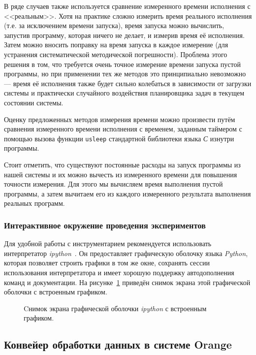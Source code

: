 В ряде случаев также используется сравнение измеренного времени исполнения с <<реальным>>. Хотя на практике сложно измерить время реального исполнения (т.е. за исключением времени запуска), время запуска можно вычислить, запустив программу, которая ничего не делает, и измерив время её исполнения. Затем можно вносить поправку на время запуска в каждое измерение (для устранения систематической методической погрешности). Проблема этого решения в том, что требуется очень точное измерение времени запуска пустой программы, но при применении тех же методов это принципиально невозможно --- время её исполнения также будет сильно колебаться в зависимости от загрузки системы и практически случайного воздействия планировщика задач в текущем состоянии системы.

Оценку предложенных методов измерения времени можно произвести путём сравнения измеренного времени исполнения с временем, заданным таймером с помощью вызова функции \texttt{usleep} стандартной библиотеки языка \textit{С} изнутри программы.

Стоит отметить, что существуют постоянные расходы на запуск программы из нашей системы и их можно вычесть из измеренного времени для повышения точности измерения. Для этого мы вычисляем время выполнения пустой программы, а затем вычитаем его из каждого измеренного результата выполнения реальных программ.


\subsubsection{Интерактивное окружение проведения экспериментов}
Для удобной работы с инструментарием рекомендуется использовать интерпретатор \textit{ipython}~\cite{ipython}. Он предоставляет графическую оболочку языка \textit{Python}, которая позволяет строить графики в том же окне, сохранять сессии использования интерпретатора и имеет хорошую поддержку автодополнения команд и документации. На рисунке~\ref{img:besselj} приведён снимок экрана этой графической оболочки с встроенным графиком.

\begin{figure}[H]
    \caption{Cнимок экрана графической оболочки \textit{ipython} с встроенным графиком.}
    \label{img:besselj}
\end{figure}

\subsection{Конвейер обработки данных в системе Orange}
\label{orange-pipeline}

